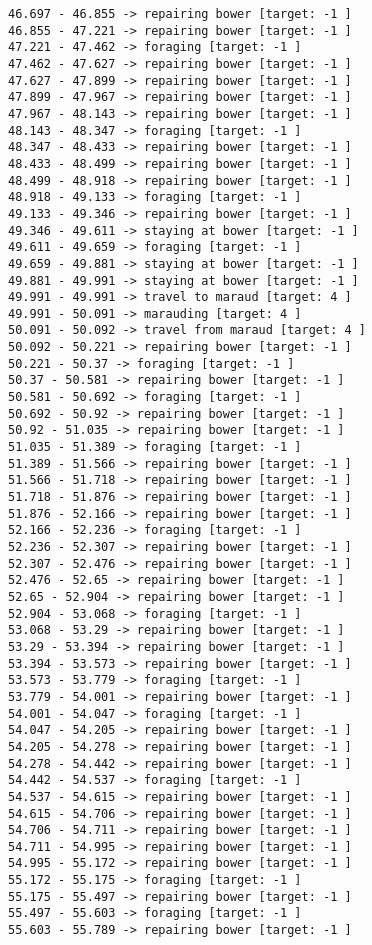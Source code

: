 \documentclass[11pt]{article}
\begin{document}
\begin{Verbatim}[commandchars=\\\{\}]
46.697 - 46.855 -> repairing bower [target: -1 ]
46.855 - 47.221 -> repairing bower [target: -1 ]
47.221 - 47.462 -> foraging [target: -1 ]
47.462 - 47.627 -> repairing bower [target: -1 ]
47.627 - 47.899 -> repairing bower [target: -1 ]
47.899 - 47.967 -> repairing bower [target: -1 ]
47.967 - 48.143 -> repairing bower [target: -1 ]
48.143 - 48.347 -> foraging [target: -1 ]
48.347 - 48.433 -> repairing bower [target: -1 ]
48.433 - 48.499 -> repairing bower [target: -1 ]
48.499 - 48.918 -> repairing bower [target: -1 ]
48.918 - 49.133 -> foraging [target: -1 ]
49.133 - 49.346 -> repairing bower [target: -1 ]
49.346 - 49.611 -> staying at bower [target: -1 ]
49.611 - 49.659 -> foraging [target: -1 ]
49.659 - 49.881 -> staying at bower [target: -1 ]
49.881 - 49.991 -> staying at bower [target: -1 ]
49.991 - 49.991 -> travel to maraud [target: 4 ]
49.991 - 50.091 -> marauding [target: 4 ]
50.091 - 50.092 -> travel from maraud [target: 4 ]
50.092 - 50.221 -> repairing bower [target: -1 ]
50.221 - 50.37 -> foraging [target: -1 ]
50.37 - 50.581 -> repairing bower [target: -1 ]
50.581 - 50.692 -> foraging [target: -1 ]
50.692 - 50.92 -> repairing bower [target: -1 ]
50.92 - 51.035 -> repairing bower [target: -1 ]
51.035 - 51.389 -> foraging [target: -1 ]
51.389 - 51.566 -> repairing bower [target: -1 ]
51.566 - 51.718 -> repairing bower [target: -1 ]
51.718 - 51.876 -> repairing bower [target: -1 ]
51.876 - 52.166 -> repairing bower [target: -1 ]
52.166 - 52.236 -> foraging [target: -1 ]
52.236 - 52.307 -> repairing bower [target: -1 ]
52.307 - 52.476 -> repairing bower [target: -1 ]
52.476 - 52.65 -> repairing bower [target: -1 ]
52.65 - 52.904 -> repairing bower [target: -1 ]
52.904 - 53.068 -> foraging [target: -1 ]
53.068 - 53.29 -> repairing bower [target: -1 ]
53.29 - 53.394 -> repairing bower [target: -1 ]
53.394 - 53.573 -> repairing bower [target: -1 ]
53.573 - 53.779 -> foraging [target: -1 ]
53.779 - 54.001 -> repairing bower [target: -1 ]
54.001 - 54.047 -> foraging [target: -1 ]
54.047 - 54.205 -> repairing bower [target: -1 ]
54.205 - 54.278 -> repairing bower [target: -1 ]
54.278 - 54.442 -> repairing bower [target: -1 ]
54.442 - 54.537 -> foraging [target: -1 ]
54.537 - 54.615 -> repairing bower [target: -1 ]
54.615 - 54.706 -> repairing bower [target: -1 ]
54.706 - 54.711 -> repairing bower [target: -1 ]
54.711 - 54.995 -> repairing bower [target: -1 ]
54.995 - 55.172 -> repairing bower [target: -1 ]
55.172 - 55.175 -> foraging [target: -1 ]
55.175 - 55.497 -> repairing bower [target: -1 ]
55.497 - 55.603 -> foraging [target: -1 ]
55.603 - 55.789 -> repairing bower [target: -1 ]

\end{Verbatim}
\end{document}
